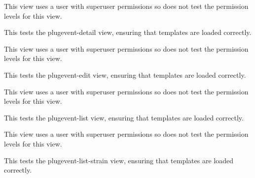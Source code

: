 \documentclass[letterpaper,10pt,english]{sphinxmanual}
\begin{document}
\begin{fulllineitems}
\begin{fulllineitems}
This view uses a user with superuser permissions so does not test the permission levels for this view.

\end{fulllineitems}



\begin{fulllineitems}
\label{api:mousedb.timed_mating.tests.Timed_MatingViewTests.test_plugevent_detail}
This tests the plugevent-detail view, ensuring that templates are loaded correctly.

This view uses a user with superuser permissions so does not test the permission levels for this view.

\end{fulllineitems}



\begin{fulllineitems}
\label{api:mousedb.timed_mating.tests.Timed_MatingViewTests.test_plugevent_edit}
This tests the plugevent-edit view, ensuring that templates are loaded correctly.

This view uses a user with superuser permissions so does not test the permission levels for this view.

\end{fulllineitems}



\begin{fulllineitems}
\label{api:mousedb.timed_mating.tests.Timed_MatingViewTests.test_plugevent_list}
This tests the plugevent-list view, ensuring that templates are loaded correctly.

This view uses a user with superuser permissions so does not test the permission levels for this view.

\end{fulllineitems}



\begin{fulllineitems}
\label{api:mousedb.timed_mating.tests.Timed_MatingViewTests.test_plugevent_list_strain}
This tests the plugevent-list-strain view, ensuring that templates are loaded correctly.


\end{fulllineitems}
\end{fulllineitems}
\end{document}
